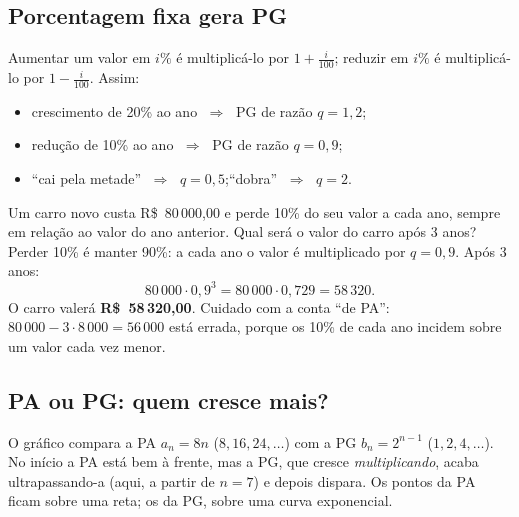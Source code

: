\subsection{Porcentagem fixa gera PG}

Aumentar um valor em $i\%$ é multiplicá-lo por $1 + \frac{i}{100}$; reduzir em
$i\%$ é multiplicá-lo por $1 - \frac{i}{100}$. Assim:
\begin{itemize}[nosep]
  \item crescimento de 20\% ao ano $\;\Rightarrow\;$ PG de razão $q = 1{,}2$;
  \item redução de 10\% ao ano $\;\Rightarrow\;$ PG de razão $q = 0{,}9$;
  \item “cai pela metade” $\;\Rightarrow\;$ $q = 0{,}5$;\quad “dobra” $\;\Rightarrow\;$ $q = 2$.
\end{itemize}

\begin{exemplo}
Um carro novo custa R\$~80\,000,00 e perde 10\% do seu valor a cada ano, sempre
em relação ao valor do ano anterior. Qual será o valor do carro após 3 anos?
\solucao
Perder 10\% é manter 90\%: a cada ano o valor é multiplicado por $q = 0{,}9$.
Após 3 anos:
\[
80\,000 \cdot 0{,}9^3 = 80\,000 \cdot 0{,}729 = 58\,320 .
\]
O carro valerá \textbf{R\$~58\,320,00}. Cuidado com a conta “de PA”:
$80\,000 - 3\cdot 8\,000 = 56\,000$ está errada, porque os 10\% de cada ano
incidem sobre um valor cada vez menor.
\end{exemplo}

\subsection{PA ou PG: quem cresce mais?}

O gráfico compara a PA $a_n = 8n$ ($8, 16, 24, \dots$) com a PG
$b_n = 2^{n-1}$ ($1, 2, 4, \dots$). No início a PA está bem à frente, mas a PG,
que cresce \emph{multiplicando}, acaba ultrapassando-a (aqui, a partir de
$n = 7$) e depois dispara. Os pontos da PA ficam sobre uma reta; os da PG, sobre
uma curva exponencial.

\begin{center}
\end{center}

